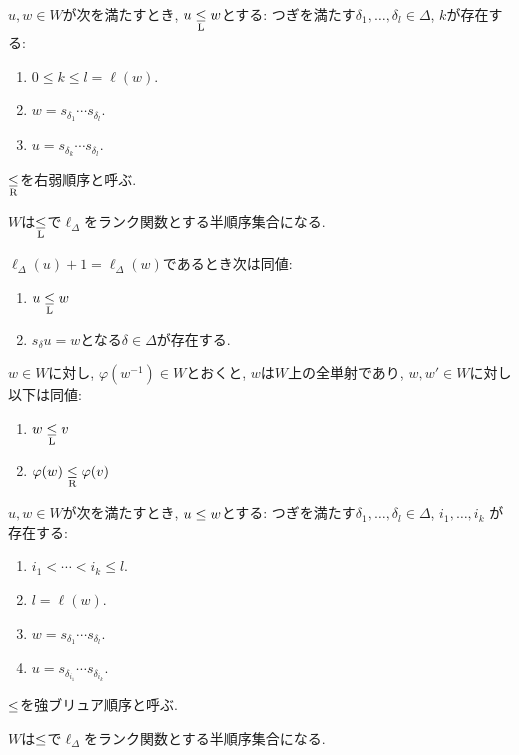 \begin{definition}
  $u,w\in W$が次を満たすとき, $u\mathrel{\underset{\text{L}}{\leq}} w$とする:
  つぎを満たす$\delta_1,\ldots,\delta_l\in\Delta$, $k$が存在する:
  \begin{enumerate}
    \item $0\leq k\leq l=\ell(w)$.
    \item $w=s_{\delta_1}\cdots s_{\delta_l}$.
    \item $u=s_{\delta_k}\cdots s_{\delta_l}$.
  \end{enumerate}
  $\mathrel{\underset{\text{R}}{\leq}}$を右弱順序と呼ぶ.
\end{definition}
\begin{prop}
  $W$は$\mathrel{\underset{\text{L}}{\leq}}$で$\ell_\Delta$をランク関数とする半順序集合になる.
\end{prop}
\begin{prop}
  $\ell_\Delta(u)+1=\ell_\Delta(w)$であるとき次は同値:
  \begin{enumerate}
  \item $u\mathrel{\underset{\text{L}}{\leq}} w$
  \item $s_{\delta} u= w$となる$\delta\in\Delta$が存在する.
  \end{enumerate}
\end{prop}
\begin{remark}
  $w\in W$に対し, $\varphi(w^{-1})\in W$とおくと,
  $w$は$W$上の全単射であり,
  $w,w'\in W$に対し以下は同値:
  \begin{enumerate}
    \item $w\mathrel{\underset{\text{L}}{\leq}} v$
    \item $\varphi(w) \mathrel{\underset{\text{R}}{\leq}} \varphi(v)$
  \end{enumerate}
\end{remark}
\begin{definition}
  $u,w\in W$が次を満たすとき, $u\mathrel{\leq} w$とする:
  つぎを満たす$\delta_1,\ldots,\delta_l\in\Delta$, $i_1,\ldots,i_k$ が存在する:
  \begin{enumerate}
    \item $i_1 <\cdots <i_k\leq l$.
    \item $l=\ell(w)$.
    \item $w=s_{\delta_1}\cdots s_{\delta_l}$.
    \item $u=s_{\delta_{i_1}}\cdots s_{\delta_{i_k}}$.
  \end{enumerate}
  $\mathrel{\leq}$を強ブリュア順序と呼ぶ.
\end{definition}
\begin{prop}
  $W$は$\mathrel{\leq}$で$\ell_\Delta$をランク関数とする半順序集合になる.
\end{prop}

